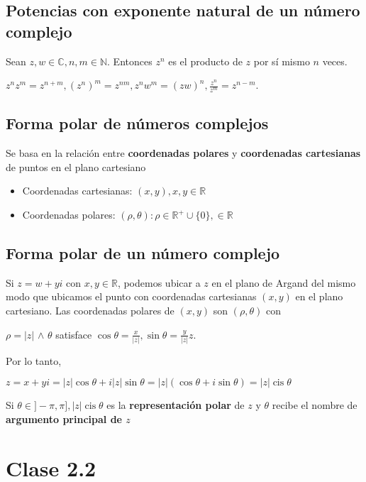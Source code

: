\documentclass{article}
\DeclareMathOperator\cis{cis}
\begin{document}
\subsection{Potencias con exponente natural de un número complejo}
Sean $z,w\in \mathbb{C}, n,m\in \mathbb{N}$. Entonces $z^n$ es el producto de $z$ por sí mismo $n$ veces.
\begin{center}
    $z^nz^m=z^{n+m}, (z^n)^m=z^{nm}, z^nw^m=(zw)^n, \frac{z^n}{z^m}=z^{n-m}$.
\end{center}

\subsection{Forma polar de números complejos}
Se basa en la relación entre \textbf{coordenadas polares} y \textbf{coordenadas cartesianas} de puntos en el plano cartesiano
\begin{itemize}
    \item Coordenadas cartesianas: $(x,y), x,y\in \mathbb{R}$
    \item Coordenadas polares: $(\rho,\theta): \rho \in \mathbb{R}^+ \cup \{0\}, \in \mathbb{R}$
\end{itemize}

\subsection{Forma polar de un número complejo}
Si $z=w+yi$ con $x,y\in \mathbb{R}$, podemos ubicar a $z$ en el plano de Argand del mismo modo que ubicamos el punto con coordenadas cartesianas $(x,y)$ en el plano cartesiano.
Las coordenadas polares de $(x,y)$ son $(\rho,\theta)$ con 
\begin{center}
    $\rho=|z|$ $\wedge$ $\theta$  satisface  $\cos{\theta}=\frac{x}{|z|},\sin{\theta}=\frac{y}{|z|}z$.    
\end{center}

Por lo tanto, 
\begin{center}
    $z=x+yi=|z|\cos{\theta}+i|z|\sin{\theta}=|z|(\cos{\theta}+i\sin{\theta})=|z|\cis{\theta}$
\end{center}
Si $\theta \in ]-\pi,\pi], |z|\cis{\theta}$ es la \textbf{representación polar} de $z$ y $\theta$ recibe el nombre de \textbf{argumento principal de $z$}

\section{Clase 2.2}
\end{document}
